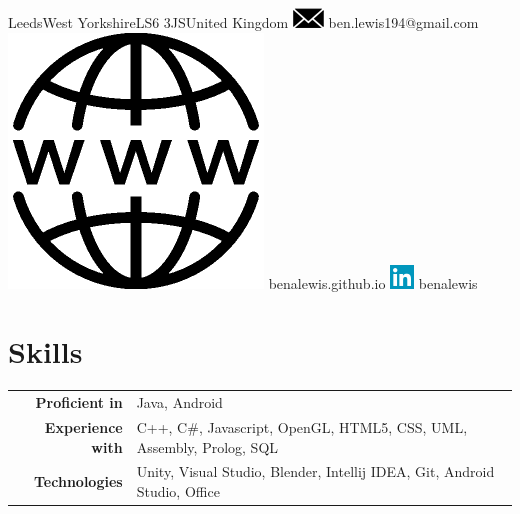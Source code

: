 \documentclass[a4paper, 12pt]{cv_class}
\begin{document}
\address{9 Grimthorpe Terrace}{Leeds}{West Yorkshire}{LS6 3JS}{United Kingdom}
		{\includegraphics[scale=.3]{email_icon.png} ben.lewis194@gmail.com}	%
		{\includegraphics[scale=.03]{website_icon.png} benalewis.github.io} %
		{\includegraphics[scale=0.3]{linkedin_icon.png} benalewis} %
\section{Skills}

\begin{tabular}{r l}
	\textbf{Proficient in} & Java, Android \\
	\textbf{Experience with} & C++, C\#, Javascript, OpenGL, HTML5, CSS, UML, Assembly, Prolog, SQL\\
	\textbf{Technologies} &  Unity, Visual Studio, Blender, Intellij IDEA, Git, Android Studio, Office
\end{tabular}
\end{document}
